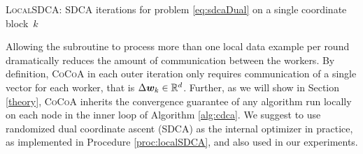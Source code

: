 \documentclass{article} %
\newcommand{\algname}{\textsc{CoCoA}\xspace}  %
\newcommand{\localSDCA}{\textsc{LocalSDCA}\xspace}
\newcounter{procCf}
\newenvironment{procedureCustom}
  {\refstepcounter{procCf}%
    \renewcommand*{\algorithmcfname}{Procedure}%
    \begin{algorithm}\renewcommand\thealgocf{\Alph{procCf}}}
  {\end{algorithm}\addtocounter{algocf}{-1}}
\begin{document}
\SetAlgoSkip{}
\begin{procedureCustom}%
\caption{\localSDCA: SDCA iterations for problem \eqref{eq:sdcaDual} on a single coordinate block~$k$}
\label{proc:localSDCA}
\SetAlgoLined
{}
\end{procedureCustom}


Allowing the subroutine to process more than one local data example per round dramatically reduces the amount of communication between the workers.
By definition, \algname in each outer iteration only requires communication of a single vector for each worker, that is $\Delta {\bm{w}}_{k} \in \mathbb{R}^d$. Further, as we will show in Section \ref{theory}, \algname inherits the convergence guarantee of any %
algorithm run
locally on each node in the inner loop of Algorithm \ref{alg:cdca}. 
We suggest to use randomized dual coordinate ascent (SDCA) \cite{ShalevShwartz:2013wl} as the internal optimizer in practice, as implemented in Procedure \ref{proc:localSDCA}, and also used in our experiments.
\end{document}
